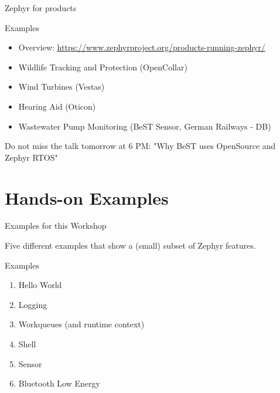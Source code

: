 \documentclass[10pt, aspectratio=169]{beamer}
\begin{document}
\begin{frame}[fragile]{Zephyr for products}

  \begin{block}{Examples}
    \begin{itemize}
       \item Overview: {\scriptsize \url{https://www.zephyrproject.org/products-running-zephyr/}}
       \item Wildlife Tracking and Protection (OpenCollar)
       \item Wind Turbines (Vestas)
       \item Hearing Aid (Oticon)
       \item Wastewater Pump Monitoring (BeST Sensor, German Railways - DB)
    \end{itemize}

  Do not miss the talk tomorrow at 6 PM: "Why BeST uses OpenSource and Zephyr RTOS"

  \end{block}
\end{frame}

\section{Hands-on Examples}

\begin{frame}[fragile]{Examples for this Workshop}

  Five different examples that show a (small) subset of Zephyr features.

  \begin{block}{Examples}
    \begin{enumerate}
       \item Hello World
       \item Logging
       \item Workqueues (and runtime context)
       \item Shell
       \item Sensor
       \item Bluetooth Low Energy
    \end{enumerate}
  \end{block}
\end{frame}
\end{document}

